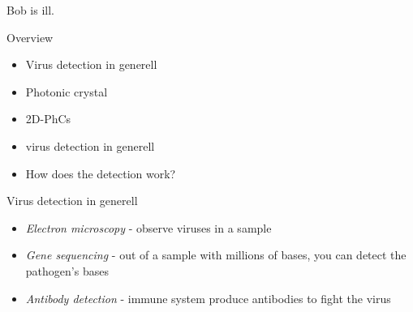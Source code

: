 


\frame{\maketitle}

\begin{frame}
  Bob is ill.
\end{frame}

\begin{frame}{Overview}
\begin{itemize}
  \setlength\itemsep{1.2em}
  \item{Virus detection in generell}
  \item{Photonic crystal}
  \item{2D-PhCs}
  \item{virus detection in generell}
  \item{How does the detection work?}
\end{itemize}
\end{frame}

\begin{frame}{Virus detection in generell}
  \begin{itemize}
    \setlength\itemsep{1.2em}
    \item{\emph{Electron microscopy} - observe viruses in a sample   }
    \item{\emph{Gene sequencing} - out of a sample with millions of bases, you can detect the pathogen's bases   }
    \item{\emph{ Antibody detection} - immune system produce antibodies to fight the virus }
    \end{itemize}
\end{frame}

